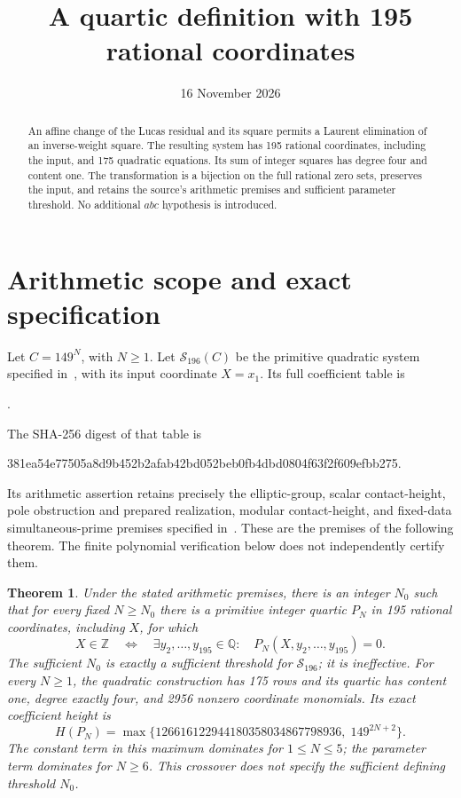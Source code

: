 \documentclass[11pt,a4paper]{article}
\title{A quartic definition with 195 rational coordinates}
\author{}\date{16 November 2026}
\newtheorem{theorem}{Theorem}[section]
\newcommand{\Q}{\mathbb Q}\newcommand{\Z}{\mathbb Z}
\begin{document}
\maketitle

\begin{abstract}
An affine change of the Lucas residual and its square permits a
Laurent elimination of an inverse-weight square. The resulting
system has 195 rational coordinates, including the input, and 175
quadratic equations. Its sum of integer squares has degree
four and content one. The transformation is a bijection on the full
rational zero sets, preserves the input, and retains the source's
arithmetic premises and sufficient parameter threshold. No additional
$abc$ hypothesis is introduced.
\end{abstract}

\section{Arithmetic scope and exact specification}

Let $C=149^N$, with $N\ge1$. Let $\mathcal S_{196}(C)$ be the
primitive quadratic system specified in~\cite{Primitive}, with its
input coordinate $X=x_1$. Its full coefficient table is
\begin{center}\small
{}.
\end{center}
The SHA-256 digest of that table is
\begin{center}\small\ttfamily
381ea54e77505a8d9b452b2afab42bd052beb0fb4dbd0804f63f2f609efbb275.
\end{center}
Its arithmetic assertion retains precisely the elliptic-group,
scalar contact-height, pole obstruction and prepared realization,
modular contact-height, and fixed-data simultaneous-prime premises
specified in~\cite{InverseVieta,Laurent}. These are the premises of the
following theorem. The finite polynomial verification below does not
independently certify them.

\begin{theorem}\label{thm:main}
Under the stated arithmetic premises, there is an integer $N_0$ such
that for every fixed $N\ge N_0$ there is a primitive integer quartic
$P_N$ in 195 rational coordinates, including $X$, for which
\[
 X\in\Z\quad\Longleftrightarrow\quad
 \exists y_2,\ldots,y_{195}\in\Q:\quad
 P_N(X,y_2,\ldots,y_{195})=0.
\]
The sufficient $N_0$ is exactly a sufficient threshold for
$\mathcal S_{196}$; it is ineffective. For every $N\ge1$, the
quadratic construction has 175 rows and its quartic has content one,
degree exactly four, and 2956 nonzero coordinate monomials. Its exact
coefficient height is
\[
 H(P_N)=\max\{126616122944180358034867798936,\;149^{2N+2}\}.
\]
The constant term in this maximum dominates for $1\le N\le5$;
the parameter term dominates for $N\ge6$. This crossover does not
specify the sufficient defining threshold $N_0$.
\end{theorem}
\end{document}
